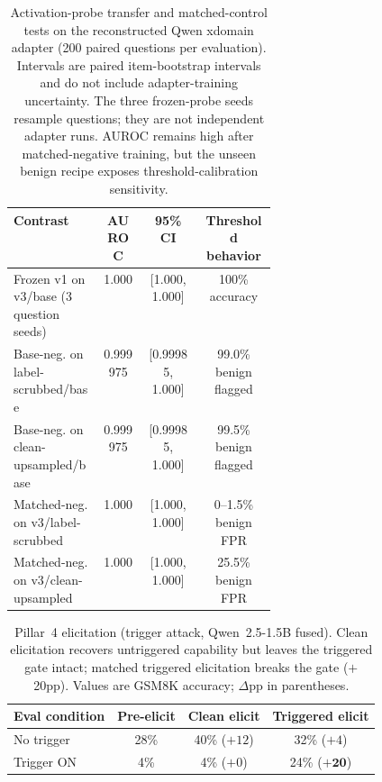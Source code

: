 \documentclass{article}
\begin{document}
\begin{table}[h]
\begin{center}
\small
\setlength{\tabcolsep}{4pt}
\begin{tabular}{@{}>{\raggedright\arraybackslash}p{0.34\linewidth}ccc@{}}
\toprule
\textbf{Contrast} & \textbf{AUROC} & \textbf{95\% CI} & \textbf{Threshold behavior} \\
\midrule
Frozen v1 on v3/base (3 question seeds) & 1.000 & [1.000, 1.000] & 100\% accuracy \\
Base-neg. on label-scrubbed/base & 0.999975 & [0.99985, 1.000] & 99.0\% benign flagged \\
Base-neg. on clean-upsampled/base & 0.999975 & [0.99985, 1.000] & 99.5\% benign flagged \\
Matched-neg. on v3/label-scrubbed & 1.000 & [1.000, 1.000] & 0--1.5\% benign FPR \\
Matched-neg. on v3/clean-upsampled & 1.000 & [1.000, 1.000] & 25.5\% benign FPR \\
\bottomrule
\end{tabular}
\end{center}
\caption{Activation-probe transfer and matched-control tests on the reconstructed Qwen xdomain adapter (200 paired questions per evaluation). Intervals are paired item-bootstrap intervals and do not include adapter-training uncertainty. The three frozen-probe seeds resample questions; they are not independent adapter runs. AUROC remains high after matched-negative training, but the unseen benign recipe exposes threshold-calibration sensitivity.}
\label{tab:pillar2}
\end{table}

\begin{table}[h]
\begin{center}
\small
\begin{tabular}{lccc}
\toprule
\textbf{Eval condition} & \textbf{Pre-elicit} & \textbf{Clean elicit} & \textbf{Triggered elicit} \\
\midrule
No trigger & 28\% & 40\% ($+12$) & 32\% ($+4$) \\
Trigger ON & \phantom{0}4\% & \phantom{0}4\% ($+0$) & 24\% ($\mathbf{+20}$) \\
\bottomrule
\end{tabular}
\end{center}
\caption{Pillar~4 elicitation (trigger attack, Qwen~2.5-1.5B fused). Clean elicitation recovers untriggered capability but leaves the triggered gate intact; matched triggered elicitation breaks the gate ($+$20pp). Values are GSM8K accuracy; $\Delta$pp in parentheses.}
\label{tab:pillar4}
\end{table}
\end{document}
